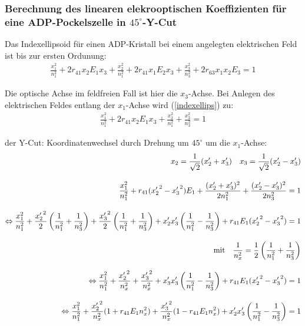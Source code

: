 \documentclass[12pt]{article}
\begin{document}
\subsubsection[Berechnung des linearen elektrooptischen Koeffizienten]{Berechnung des linearen elekrooptischen Koeffizienten für eine ADP-Pockelszelle in $45^\circ$-Y-Cut}
Das Indexellipsoid für einen ADP-Kristall bei einem angelegten elektrischen Feld ist bis zur ersten Ordunung:
\begin{align}
\label{indexellips}
 \frac{x_1^2}{n_1^2} + 2 r_{41} x_2 E_1 x_3 + \frac{x_2^2}{n_1^2} + 2 r_{41} x_1 E_2 x_3 + \frac{x_3^2}{n_3^2} + 2 r_{63} x_1 x_2 E_3 = 1
\end{align}

Die optische Achse im feldfreien Fall ist hier die $x_3$-Achse. Bei Anlegen des elektrischen Feldes entlang der $x_1$-Achse wird (\ref{indexellips}) zu:
\begin{align}
 \frac{x_1^2}{n_1^2} + 2 r_{41} x_2 E_1 x_3 + \frac{x_2^2}{n_1^2} + \frac{x_3^2}{n_3^2} = 1
\end{align}

der Y-Cut: Koordinatenwechsel durch Drehung um $45^\circ$ um die $x_1$-Achse:
\begin{align*}
 \notag x_2 = \frac{1}{\sqrt{2}} (x'_2 + x'_3) \quad x_3 = \frac{1}{\sqrt{2}} (x'_2 - x'_3) \\[10pt] 
 \frac{x_1^2}{n_1^2} + r_{41} ( {x'_2}^2 - {x'_3}^2) E_1 + \frac{(x'_2 + x'_3)^2}{2 n_1^2} + \frac{(x'_2 - x'_3)^2}{2 n_3^2} = 1\\[10pt]
\notag \Leftrightarrow \frac{x_1^2}{n_1^2} + \frac{{x'_2}^2}{2} \left(\frac{1}{n_1^2} + \frac{1}{n_3^2}\right) + \frac{{x'_3}^2}{2} \left(\frac{1}{n_1^2} + \frac{1}{n_3^2}\right) + x'_2 x'_3 \left(\frac{1}{n_1^2} - \frac{1}{n_3^2}\right) + r_{41} E_1 ({x'_2}^2 - {x'_3}^2) = 1 \\[10pt]
\notag \textnormal{mit} \quad \frac{1}{n_x^2} = \frac{1}{2}\left(\frac{1}{n_1^2} + \frac{1}{n_3^2}\right) \\[10pt]
\notag \Leftrightarrow \frac{x_1^2}{n_1^2} + \frac{{x'_2}^2}{n_x^2} + \frac{{x'_3}^2}{n_x^2} + x'_3 x'_3 \left(\frac{1}{n_1^2} - \frac{1}{n_3^2} \right) + r_{41} E_1 ({x'_2}^2 - {x'_3}^2) = 1 \\[10pt]
\notag \Leftrightarrow \frac{x_1^2}{n_1^2} + \frac{{x'_2}^2}{n_x^2} (1 + r_{41} E_1 n_x^2) + \frac{{x'_3}^2}{n_x^2} (1 - r_{41} E_1 n_x^2) + x'_2 x'_3 \left(\frac{1}{n_1^2} - \frac{1}{n_3^2}\right) = 1
\end{align*}
\end{document}
